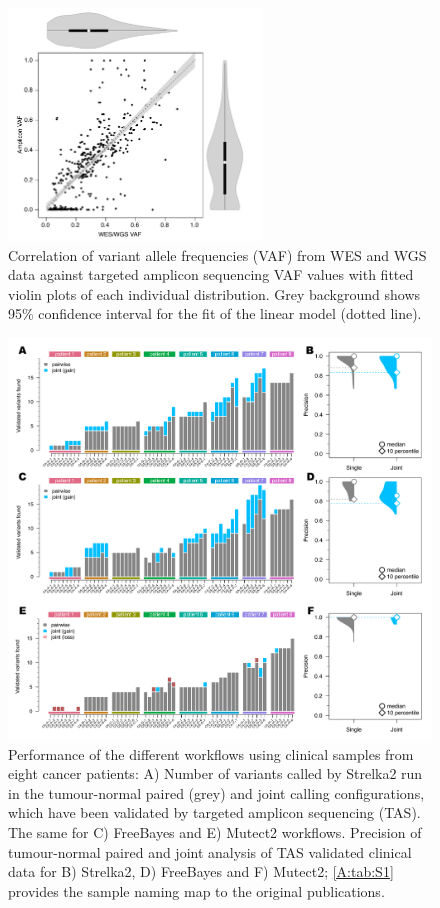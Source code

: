\begin{figure}[!ht]
\centering
  \includegraphics[width=0.6\textwidth]{Appendices/Variantcalling/supp/S7}
  \caption[Correlation of variant allele frequencies in validation]{Correlation of variant allele frequencies (VAF) from WES and WGS data against targeted amplicon sequencing VAF values with fitted violin plots of each individual distribution. Grey background shows 95\% confidence interval for the fit of the linear model (dotted line).}\label{A:fig:S07}
\end{figure}


\begin{figure}[htp]
\centering
  \includegraphics[width=\textwidth]{Appendices/Variantcalling/supp/S8}
  \caption[Performance of the different workflows using clinical samples from eight cancer patients]{Performance of the different workflows using clinical samples from eight cancer patients: A) Number of variants called by Strelka2 run in the tumour-normal paired (grey) and joint calling configurations, which have been validated by targeted amplicon sequencing (TAS). The same for C) FreeBayes and E) Mutect2 workflows. Precision of tumour-normal paired and joint analysis of TAS validated clinical data for B) Strelka2, D) FreeBayes and F) Mutect2; \protect\autoref{A:tab:S1} provides the sample naming map to the original publications.}\label{A:fig:S08}
\end{figure}


